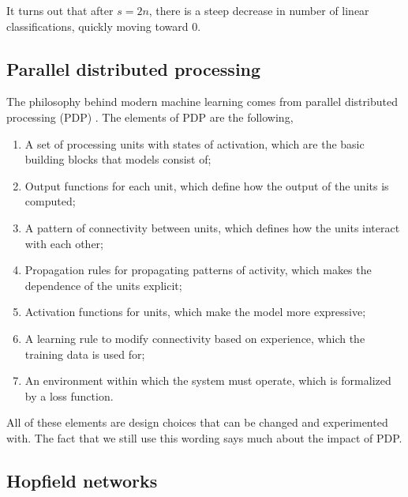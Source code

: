 It turns out that after $s=2n$, there is a steep decrease in number of linear classifications,
quickly moving toward 0.

\subsection{Parallel distributed processing}

The philosophy behind modern machine learning comes from parallel distributed processing (PDP)
\citep{rumelhart1986general}. The elements of PDP are the following,
\begin{enumerate}
    \item A set of processing units with states of activation, which are the basic building blocks that
          models consist of;
    \item Output functions for each unit, which define how the output of the units is computed;
    \item A pattern of connectivity between units, which defines how the units interact with each other;
    \item Propagation rules for propagating patterns of activity, which makes the dependence of the units
          explicit;
    \item Activation functions for units, which make the model more expressive;
    \item A learning rule to modify connectivity based on experience, which the training data is used for;
    \item An environment within which the system must operate, which is formalized by a loss function.
\end{enumerate}
All of these elements are design choices that can be changed and experimented with. The fact that we
still use this wording says much about the impact of PDP.

%

\subsection{Hopfield networks}

